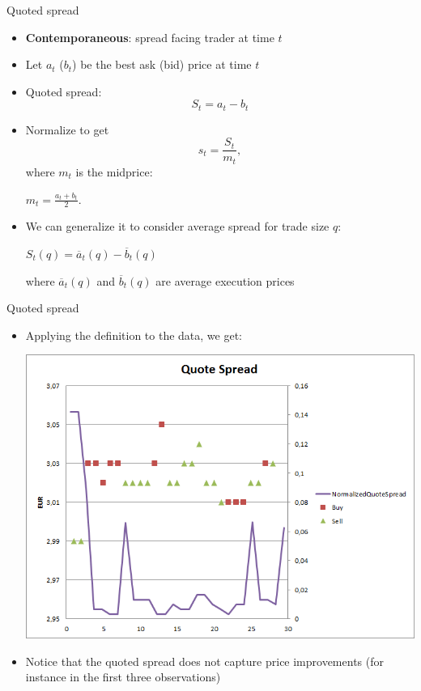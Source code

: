\begin{frame}{Quoted spread}
	\begin{itemize}
		\item \textbf{Contemporaneous}: spread facing trader at time $t$
		\item Let $a_t$ ($b_t$) be the best ask (bid) price at time $t$
		\item \alert{Quoted spread}:
		\[
		S_t = a_t -b_t
		\]
		\item Normalize to get 
		\[
		s_t = \frac{S_t}{m_t},
		\]
		where $m_t$ is the midprice:
		\begin{center}
			$
			m_t = \frac{a_t+b_t}{2}.
			$
		\end{center}
		\item We can generalize it to consider average spread for trade size $q$: 
		\begin{center}$S_t(q)=\overline{a}_t(q)-\overline{b}_t(q)$\end{center}
		where $\overline{a}_t(q)$ and $\overline{b}_t(q)$ are average execution prices
	\end{itemize}
\end{frame}


\begin{frame}{Quoted spread}
	\begin{itemize}
		\item Applying the definition to the data, we get:
		\begin{center}	
			\includegraphics[scale=0.35]{pics/L2_quotespread}
		\end{center}
		\item Notice that the quoted spread does not capture price improvements (for instance in the first three observations)
	\end{itemize}
\end{frame}



